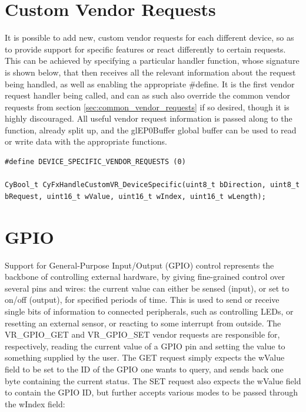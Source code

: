\documentclass[a4paper,12pt]{report}
\begin{document}
\section{Custom Vendor Requests} \label{sec:custom_vendor_requests}

It is possible to add new, custom vendor requests for each different device, so as to provide support for specific features or react differently to certain requests. This can be achieved by specifying a particular handler function, whose signature is shown below, that then receives all the relevant information about the request being handled, as well as enabling the appropriate \#define. It is the first vendor request handler being called, and can as such also override the common vendor requests from section \ref{sec:common_vendor_requests} if so desired, though it is highly discouraged.
All useful vendor request information is passed along to the function, already split up, and the glEP0Buffer global buffer can be used to read or write data with the appropriate functions.

\begin{lstlisting}
#define DEVICE_SPECIFIC_VENDOR_REQUESTS (0)

CyBool_t CyFxHandleCustomVR_DeviceSpecific(uint8_t bDirection, uint8_t bRequest, uint16_t wValue, uint16_t wIndex, uint16_t wLength);
\end{lstlisting}

\section{GPIO} \label{sec:gpio}

Support for General-Purpose Input/Output (GPIO) control represents the backbone of controlling external hardware, by giving fine-grained control over several pins and wires: the current value can either be sensed (input), or set to on/off (output), for specified periods of time. This is used to send or receive single bits of information to connected peripherals, such as controlling LEDs, or resetting an external sensor, or reacting to some interrupt from outside.
The VR\_GPIO\_GET and VR\_GPIO\_SET vendor requests are responsible for, respectively, reading the current value of a GPIO pin and setting the value to something supplied by the user.
The GET request simply expects the wValue field to be set to the ID of the GPIO one wants to query, and sends back one byte containing the current status.
The SET request also expects the wValue field to contain the GPIO ID, but further accepts various modes to be passed through the wIndex field:
\end{document}
